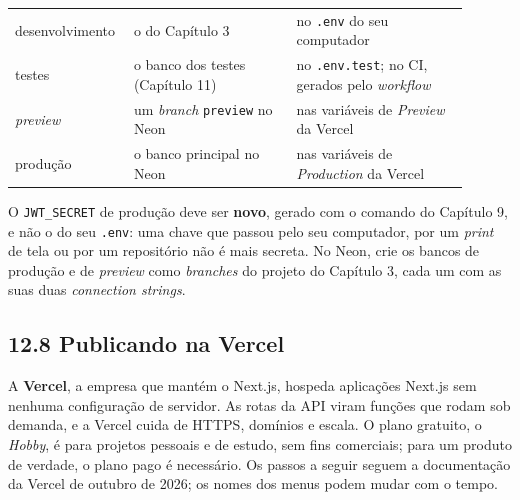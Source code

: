 \begin{center}
\begin{tabular}{@{}P{0.2\linewidth}P{0.34\linewidth}P{0.36\linewidth}@{}}
\toprule
{}
 &  &  \\
\midrule
desenvolvimento & o do Capítulo 3 & no \texttt{.env} do seu computador \\
 testes & o banco dos testes (Capítulo 11) & no \texttt{.env.test}; no CI, gerados pelo \textit{workflow} \\
\textit{preview} & um \textit{branch} \texttt{preview} no Neon & nas variáveis de \textit{Preview} da Vercel \\
 produção & o banco principal no Neon & nas variáveis de \textit{Production} da Vercel \\
\bottomrule
\end{tabular}
\end{center}

O \texttt{JWT\_SECRET} de produção deve ser \textbf{novo}, gerado com o comando do Capítulo 9, e não o do seu \texttt{.env}: uma chave que passou pelo seu computador, por um \textit{print} de tela ou por um repositório não é mais secreta. No Neon, crie os bancos de produção e de \textit{preview} como \textit{branches} do projeto do Capítulo 3, cada um com as suas duas \textit{connection strings}.

\subsection{12.8 Publicando na Vercel}

A \textbf{Vercel}, a empresa que mantém o Next.js, hospeda aplicações Next.js sem nenhuma configuração de servidor. As rotas da API viram funções que rodam sob demanda, e a Vercel cuida de HTTPS, domínios e escala. O plano gratuito, o \textit{Hobby}, é para projetos pessoais e de estudo, sem fins comerciais; para um produto de verdade, o plano pago é necessário. Os passos a seguir seguem a documentação da Vercel de outubro de 2026; os nomes dos menus podem mudar com o tempo.

